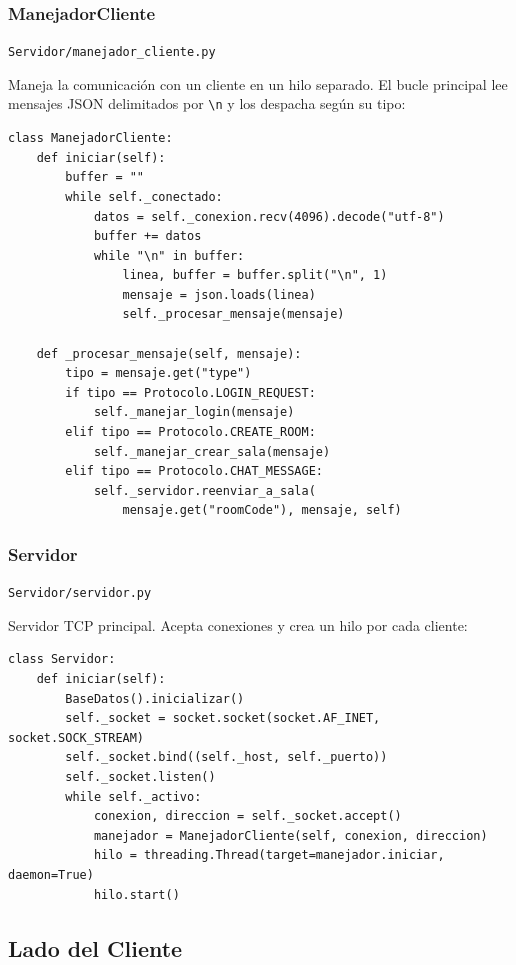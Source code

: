 \documentclass[12pt,a4paper]{article}
\begin{document}
\subsubsection{ManejadorCliente}
\texttt{Servidor/manejador\_cliente.py}

Maneja la comunicaci\'on con un cliente en un hilo separado. El bucle principal lee mensajes JSON delimitados por \verb|\n| y los despacha seg\'un su tipo:

\begin{lstlisting}
class ManejadorCliente:
    def iniciar(self):
        buffer = ""
        while self._conectado:
            datos = self._conexion.recv(4096).decode("utf-8")
            buffer += datos
            while "\n" in buffer:
                linea, buffer = buffer.split("\n", 1)
                mensaje = json.loads(linea)
                self._procesar_mensaje(mensaje)

    def _procesar_mensaje(self, mensaje):
        tipo = mensaje.get("type")
        if tipo == Protocolo.LOGIN_REQUEST:
            self._manejar_login(mensaje)
        elif tipo == Protocolo.CREATE_ROOM:
            self._manejar_crear_sala(mensaje)
        elif tipo == Protocolo.CHAT_MESSAGE:
            self._servidor.reenviar_a_sala(
                mensaje.get("roomCode"), mensaje, self)
\end{lstlisting}

\subsubsection{Servidor}
\texttt{Servidor/servidor.py}

Servidor TCP principal. Acepta conexiones y crea un hilo por cada cliente:

\begin{lstlisting}
class Servidor:
    def iniciar(self):
        BaseDatos().inicializar()
        self._socket = socket.socket(socket.AF_INET, socket.SOCK_STREAM)
        self._socket.bind((self._host, self._puerto))
        self._socket.listen()
        while self._activo:
            conexion, direccion = self._socket.accept()
            manejador = ManejadorCliente(self, conexion, direccion)
            hilo = threading.Thread(target=manejador.iniciar, daemon=True)
            hilo.start()
\end{lstlisting}

\subsection{Lado del Cliente}
\end{document}
